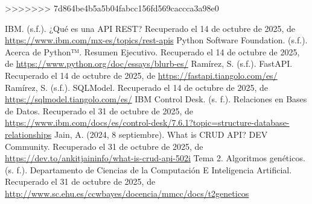 \documentclass[12pt]{article}
\begin{document}
>>>>>>> 7d864be4b5a5b04fabcc156fd569caccca3a98e0

\newpage %

\begin{thebibliography}{99}

     IBM. (s.f.). ¿Qué es una API REST? Recuperado el 14 de octubre de 2025, de \url{https://www.ibm.com/mx-es/topics/rest-apis}
     Python Software Foundation. (s.f.). Acerca de Python™. Resumen Ejecutivo. Recuperado el 14 de octubre de 2025, de \url{https://www.python.org/doc/essays/blurb-es/}
     Ramírez, S. (s.f.). FastAPI. Recuperado el 14 de octubre de 2025, de \url{https://fastapi.tiangolo.com/es/}
     Ramírez, S. (s.f.). SQLModel. Recuperado el 14 de octubre de 2025, de \url{https://sqlmodel.tiangolo.com/es/}
     IBM Control Desk. (s. f.). Relaciones en Bases de Datos. Recuperado el 31 de octubre de 2025, de \url{ https://www.ibm.com/docs/es/control-desk/7.6.1?topic=structure-database-relationships}
     Jain, A. (2024, 8 septiembre). What is CRUD API? DEV Community. Recuperado el 31 de octubre de 2025, de \url{https://dev.to/ankitjaininfo/what-is-crud-api-502i}
     Tema 2. Algoritmos genéticos. (s. f.). Departamento de Ciencias de la Computación E Inteligencia Artificial. Recuperado el 31 de octubre de 2025, de \url{http://www.sc.ehu.es/ccwbayes/docencia/mmcc/docs/t2geneticos}

\end{thebibliography}
\end{document}
